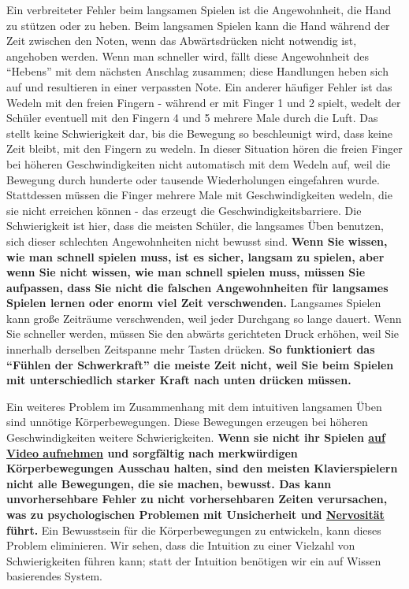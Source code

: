 Ein verbreiteter Fehler beim langsamen Spielen ist die Angewohnheit, die Hand zu stützen oder zu heben.
Beim langsamen Spielen kann die Hand während der Zeit zwischen den Noten, wenn das Abwärtsdrücken nicht notwendig ist, angehoben werden.
Wenn man schneller wird, fällt diese Angewohnheit des \enquote{Hebens} mit dem nächsten Anschlag zusammen; diese Handlungen heben sich auf und resultieren in einer verpassten Note.
Ein anderer häufiger Fehler ist das Wedeln mit den freien Fingern - während er mit Finger 1 und 2 spielt, wedelt der Schüler eventuell mit den Fingern 4 und 5 mehrere Male durch die Luft.
Das stellt keine Schwierigkeit dar, bis die Bewegung so beschleunigt wird, dass keine Zeit bleibt, mit den Fingern zu wedeln.
In dieser Situation hören die freien Finger bei höheren Geschwindigkeiten nicht automatisch mit dem Wedeln auf, weil die Bewegung durch hunderte oder tausende Wiederholungen eingefahren wurde.
Stattdessen müssen die Finger mehrere Male mit Geschwindigkeiten wedeln, die sie nicht erreichen können - das erzeugt die Geschwindigkeitsbarriere.
Die Schwierigkeit ist hier, dass die meisten Schüler, die langsames Üben benutzen, sich dieser schlechten Angewohnheiten nicht bewusst sind.
\textbf{Wenn Sie wissen, wie man schnell spielen muss, ist es sicher, langsam zu spielen, aber wenn Sie nicht wissen, wie man schnell spielen muss, müssen Sie aufpassen, dass Sie nicht die falschen Angewohnheiten für langsames Spielen lernen oder enorm viel Zeit verschwenden.}
Langsames Spielen kann große Zeiträume verschwenden, weil jeder Durchgang so lange dauert.
Wenn Sie schneller werden, müssen Sie den abwärts gerichteten Druck erhöhen, weil Sie innerhalb derselben Zeitspanne mehr Tasten drücken.
\textbf{So funktioniert das \enquote{Fühlen der Schwerkraft} die meiste Zeit nicht, weil Sie beim Spielen mit unterschiedlich starker Kraft nach unten drücken müssen.}

Ein weiteres Problem im Zusammenhang mit dem intuitiven langsamen Üben sind unnötige Körperbewegungen.
Diese Bewegungen erzeugen bei höheren Geschwindigkeiten weitere Schwierigkeiten.
\textbf{Wenn sie nicht ihr Spielen \hyperlink{c1iii13}{auf Video aufnehmen} und sorgfältig nach merkwürdigen Körperbewegungen Ausschau halten, sind den meisten Klavierspielern nicht alle Bewegungen, die sie machen, bewusst. 
Das kann unvorhersehbare Fehler zu nicht vorhersehbaren Zeiten verursachen, was zu psychologischen Problemen mit Unsicherheit und \hyperlink{c1iii15}{Nervosität} führt.}
Ein Bewusstsein für die Körperbewegungen zu entwickeln, kann dieses Problem eliminieren.
Wir sehen, dass die Intuition zu einer Vielzahl von Schwierigkeiten führen kann; statt der Intuition benötigen wir ein auf Wissen basierendes System.


